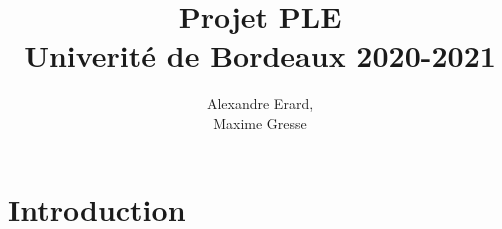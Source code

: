\documentclass[a4paper]{article}
\title{Projet PLE \\ Univerité de Bordeaux 2020-2021}
\author{
    Alexandre Erard, \\
    Maxime Gresse
    }
\begin{document}
\maketitle
\section{Introduction}     
\end{document}
